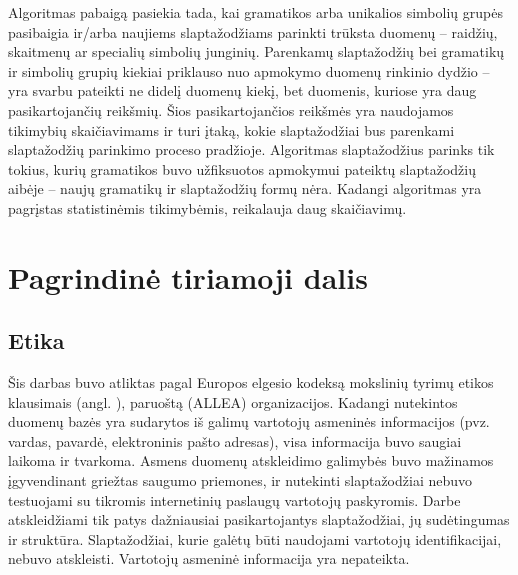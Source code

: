 \documentclass{VUMIFInfBakalaurinis}
\begin{document}
Algoritmas pabaigą pasiekia tada, kai gramatikos arba unikalios simbolių grupės 
pasibaigia ir/arba naujiems slaptažodžiams parinkti trūksta duomenų -- raidžių, 
skaitmenų ar specialių simbolių junginių. Parenkamų slaptažodžių bei gramatikų 
ir simbolių grupių kiekiai priklauso nuo apmokymo duomenų rinkinio dydžio -- yra 
svarbu pateikti ne didelį duomenų kiekį, bet duomenis, kuriose yra daug 
pasikartojančių reikšmių. Šios pasikartojančios reikšmės yra naudojamos 
tikimybių skaičiavimams ir turi įtaką, kokie slaptažodžiai bus parenkami 
slaptažodžių parinkimo proceso pradžioje.
Algoritmas slaptažodžius parinks tik tokius, kurių gramatikos buvo užfiksuotos 
apmokymui pateiktų slaptažodžių aibėje -- naujų gramatikų ir slaptažodžių formų 
nėra.
Kadangi  algoritmas yra pagrįstas statistinėmis tikimybėmis, 
reikalauja daug skaičiavimų.



\section{Pagrindinė tiriamoji dalis}
\subsection{Etika}
Šis darbas buvo atliktas pagal Europos elgesio kodeksą mokslinių tyrimų etikos 
klausimais
(angl. ), paruoštą 
 (ALLEA) 
organizacijos. Kadangi nutekintos duomenų bazės yra sudarytos iš galimų 
vartotojų asmeninės informacijos (pvz. vardas, pavardė, elektroninis pašto 
adresas), visa informacija buvo saugiai laikoma ir tvarkoma. Asmens duomenų 
atskleidimo galimybės buvo mažinamos įgyvendinant griežtas saugumo priemones, ir 
nutekinti slaptažodžiai nebuvo testuojami su tikromis internetinių paslaugų 
vartotojų paskyromis. Darbe atskleidžiami tik patys dažniausiai pasikartojantys 
slaptažodžiai, jų sudėtingumas ir struktūra. Slaptažodžiai, kurie galėtų būti 
naudojami vartotojų identifikacijai, nebuvo atskleisti. Vartotojų asmeninė 
informacija yra nepateikta.
\end{document}
